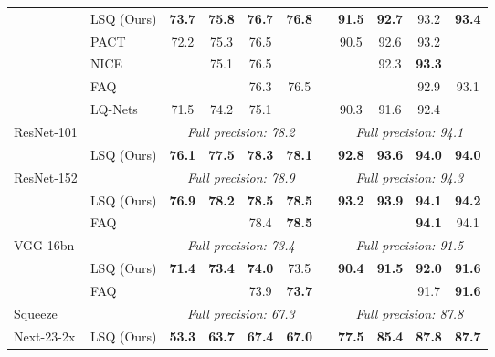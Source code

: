 \documentclass{article}
\newcommand{\tb}{\textbf}
\begin{document}
\begin{table*}[bt]
\begin{center}
\begin{tabular}{l l cccc c cccc}
					&	LSQ (Ours) 	 	& \tb{73.7}&\tb{75.8}	& \tb{76.7}	& \tb{76.8}	&	& \tb{91.5}	& \tb{92.7}	& 93.2	& \tb{93.4} \\
					&	PACT			& 72.2	& 75.3	& 76.5	&		& 	& 90.5	& 92.6	& 93.2	& \\
					& 	NICE			& 		& 75.1   	& 76.5	&		&	& 		& 92.3	& \tb{93.3}	& \\		
					&	FAQ				& 		&		& 76.3	& 76.5 	&	&		&		& 92.9	& 93.1 \\	
					& 	LQ-Nets			& 71.5	& 74.2	& 75.1	&		&	& 90.3	& 91.6	& 92.4	& \\	
		\midrule		
		ResNet-101	& & \multicolumn{4}{c}{{\textit{Full precision: 78.2}}} & & \multicolumn{4}{c}{{\textit{Full precision: 94.1}}} \\
					&	LSQ (Ours) 	 	& \tb{76.1}	& \tb{77.5}	& \tb{78.3}	& \tb{78.1}	&	& \tb{92.8}	& \tb{93.6}	& \tb{94.0}	& \tb{94.0} \\		
		\midrule		
		ResNet-152	& & \multicolumn{4}{c}{{\textit{Full precision: 78.9}}} & & \multicolumn{4}{c}{{\textit{Full precision: 94.3}}} \\		
					&	LSQ (Ours) 		& \tb{76.9}	& \tb{78.2}	& \tb{78.5}	& \tb{78.5}	& 	& \tb{93.2}	& \tb{93.9}	& \tb{94.1} & \tb{94.2} \\
					&	FAQ				& 		& 		& 78.4	& \tb{78.5}	& 	& 		& 		& \tb{94.1} 	& 94.1 \\
		\midrule		
		VGG-16bn	& & \multicolumn{4}{c}{{\textit{Full precision: 73.4}}} & & \multicolumn{4}{c}{{\textit{Full precision: 91.5}}} \\		
					&	LSQ (Ours) 		& \tb{71.4}	& \tb{73.4}	& \tb{74.0}	& 73.5 &	& \tb{90.4}	& \tb{91.5}	& \tb{92.0}	& \tb{91.6} \\	
					&	FAQ				& 		& 		& 73.9	& \tb{73.7} &	& 	& 		& 91.7	& \tb{91.6} \\
		\midrule		
		Squeeze		& & \multicolumn{4}{c}{{\textit{Full precision: 67.3}}} & & \multicolumn{4}{c}{{\textit{Full precision: 87.8}}} \\		
		Next-23-2x	&	LSQ (Ours) 		& \tb{53.3}	& \tb{63.7}	&\tb{ 67.4}	& \tb{67.0} &	& \tb{77.5}	& \tb{85.4}	& \tb{87.8}	& \tb{87.7} \\\bottomrule		
	\end{tabular}
\end{center}
\end{table*}
\end{document}
